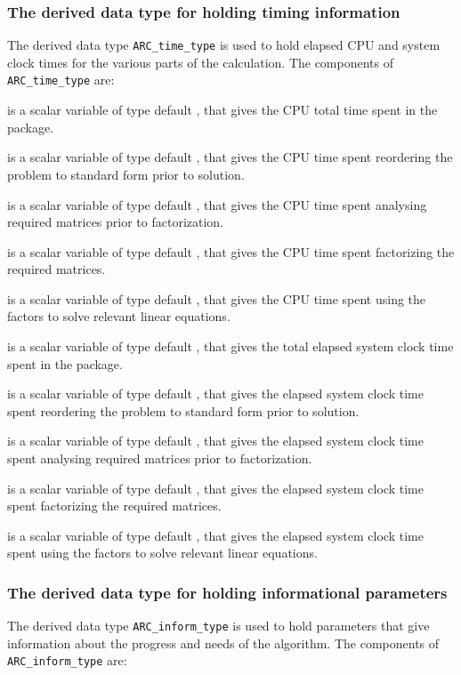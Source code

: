 \documentclass{galahad}
\newcommand{\packagename}{ARC}
\begin{document}
\subsubsection{The derived data type for holding timing
 information}\label{typetime}
The derived data type
{\tt \packagename\_time\_type}
is used to hold elapsed CPU and system clock times for the various parts
of the calculation. The components of
{\tt \packagename\_time\_type}
are:
\begin{description}
 is a scalar variable of type default \real, that gives
 the CPU total time spent in the package.

 is a scalar variable of type default \realdp, that gives
 the CPU time spent reordering the problem to standard form prior to solution.

 is a scalar variable of type default \realdp, that gives
 the CPU time spent analysing required matrices prior to factorization.

 is a scalar variable of type default \realdp, that gives
 the CPU time spent factorizing the required matrices.

 is a scalar variable of type default \realdp, that gives
 the CPU time spent using the factors to solve relevant linear equations.

 is a scalar variable of type default \real, that gives
 the total elapsed system clock time spent in the package.

 is a scalar variable of type default \realdp, that gives
 the elapsed system clock time spent reordering the problem to standard form
prior to solution.

 is a scalar variable of type default \realdp, that gives
 the  elapsed system clock time spent analysing required matrices prior to
factorization.

 is a scalar variable of type default \realdp, that gives
 the  elapsed system clock time spent factorizing the required matrices.

 is a scalar variable of type default \realdp, that gives
 the  elapsed system clock time spent using the factors to solve relevant
linear equations.

\end{description}


\subsubsection{The derived data type for holding informational
 parameters}\label{typeinform}
The derived data type
{\tt \packagename\_inform\_type}
is used to hold parameters that give information about the progress and needs
of the algorithm. The components of
{\tt \packagename\_inform\_type}
are:
\end{document}
